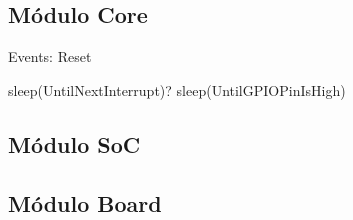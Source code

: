 \subsection{Módulo Core}

Events:
Reset


sleep(UntilNextInterrupt)?
sleep(UntilGPIOPinIsHigh)









\subsection{Módulo SoC}


\subsection{Módulo Board}



%
%
%
%
%
%
%


